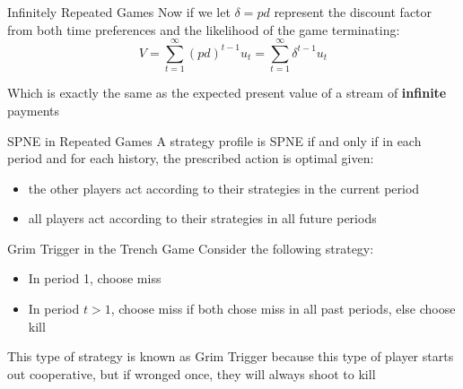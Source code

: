 \begin{frame}{Infinitely Repeated Games}
  Now if we let $\delta = pd$ represent the discount factor from both time preferences and the likelihood of the game terminating:
  $$ V = \sum_{t=1}^{\infty}(pd)^{t-1}u_t = \sum_{t=1}^{\infty}\delta^{t-1}u_t $$

  Which is exactly the same as the expected present value of a stream of \textbf{infinite} payments
\end{frame}

\begin{frame}{SPNE in Repeated Games}
  A strategy profile is SPNE if and only if in each period and for each history, the prescribed action is optimal given:
  \begin{itemize}
    \item the other players act according to their strategies in the current period
    \item all players act according to their strategies in all future periods
  \end{itemize}
\end{frame}

\begin{frame}{Grim Trigger in the Trench Game}
  Consider the following strategy: 
  \begin{itemize}
    \item In period 1, choose miss
    \item In period $t>1$, choose miss if both chose miss in all past periods, else choose kill
  \end{itemize}
  This type of strategy is known as \alert{Grim Trigger} because this type of player starts out cooperative, but if wronged once, they will always shoot to kill
\end{frame}
